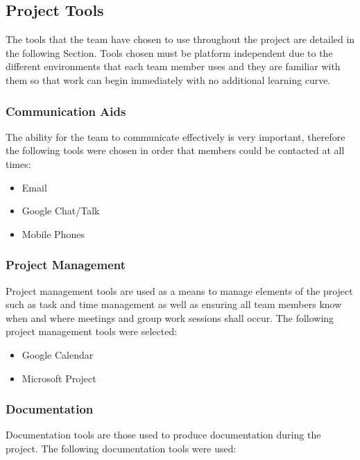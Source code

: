\subsection{Project Tools}
\label{sec:ProjectTools}
\label{sec:Tools}

The tools that the team have chosen to use throughout the project are detailed in the following Section. Tools chosen must be platform independent due to the different environments that each team member uses and they are familiar with them so that work can begin immediately with no additional learning curve.

\subsubsection{Communication Aids}
\label{sec:communicationAids}

The ability for the team to communicate effectively is very important, therefore the following tools were chosen in order that members could be contacted at all times:

\begin{itemize}
	\item{Email}
	\item{Google Chat/Talk}
	\item{Mobile Phones}
\end{itemize}

\subsubsection{Project Management}
\label{sec:ProjectManagement}

Project management tools are used as a means to manage elements of the project such as task and time management as well as ensuring all team members know when and where meetings and group work sessions shall occur. The following project management tools were selected:

\begin{itemize}
	\item{Google Calendar}
	\item{Microsoft Project}
\end{itemize}

\subsubsection{Documentation}

Documentation tools are those used to produce documentation during the project. The following documentation tools were used:


